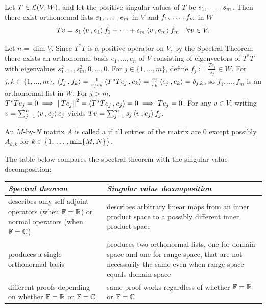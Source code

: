 \begin{thm}
  \label{thm: singular value decomposition}
  Let $T\in \mathcal{L} (V,W)$, and let the positive singular values of $T$ be $s_1, {\, \ldots \,\,}, s_m$. Then there exist orthonormal lists $e_1, {\, \ldots \,\,}, e_m$ in $V$ and $f_1, {\, \ldots \,\,}, f_m$ in $W$ \st
  \begin{equation}
    Tv = s_1 \ip{v}{e_1} f_1 + \cdots + s_m \ip{v}{e_m}f_m \quad \forall v \in V.
  \end{equation}
\end{thm}
\begin{prf}
  Let $n = \dim V$. Since $T^*T$ is a positive operator on $V$, by the Spectral Theorem there exists an orthonormal basis $e_1, \dots, e_n$ of $V$ consisting of eigenvectors of $T^*T$ with eigenvalues $s_1^2, \dots, s_m^2, 0, \dots, 0$.
  For $j \in \{1, \dots, m\}$, define $f_j := \frac{Te_j}{s_j} \in W$.
  For $j, k \in \{1, \dots, m\}$, $\ip{f_j}{f_k} = \frac{1}{s_j s_k} \ip{T^*Te_j}{e_k} = \frac{s_j}{s_k} \ip{e_j}{e_k} = \delta_{j,k}$, so $f_1, \dots, f_m$ is an orthonormal list in $W$.
  For $j > m$, $T^*Te_j = 0 \implies \norm{Te_j}^2 = \ip{T^*Te_j}{e_j} = 0 \implies Te_j = 0$.
  For any $v \in V$, writing $v = \sum_{j=1}^n \ip{v}{e_j} e_j$ yields $Tv = \sum_{j=1}^m s_j \ip{v}{e_j} f_j$.
\end{prf}

\begin{mydef}
  An $M$-by-$N$ matrix $A$ is called a  if all entries of the matrix are $0$ except possibly $A_{k,k}$ for $k \in \big\{1, {\, \ldots \,\,}, \min \{M,N\} \big \}$.
\end{mydef}

The table below compares the spectral theorem with the singular value decomposition:

\begin{center}
\begin{tabular}{|>{\RaggedRight}p{}|>{\RaggedRight}p{}|}
  \hline
  \emph{Spectral theorem} & \emph{Singular value decomposition} \\
  \hline
  describes only self-adjoint operators (when $\mathbb{F} = \mathbb{R}$) or normal operators (when $\mathbb{F} = \mathbb{C}$) & describes arbitrary linear maps from an inner product space to a possibly different inner product space \\
  \hline
  produces a single orthonormal basis &
  produces two orthonormal lists, one for domain space and one for range space, that are not necessarily the same even when range space equals domain space \\
  \hline
  different proofs depending on whether $\mathbb{F} = \mathbb{R}$ or $\mathbb{F} = \mathbb{C}$ & same proof works regardless of whether $\mathbb{F} = \mathbb{R}$ or $\mathbb{F} = \mathbb{C}$ \\
  \hline
\end{tabular}
\end{center}

